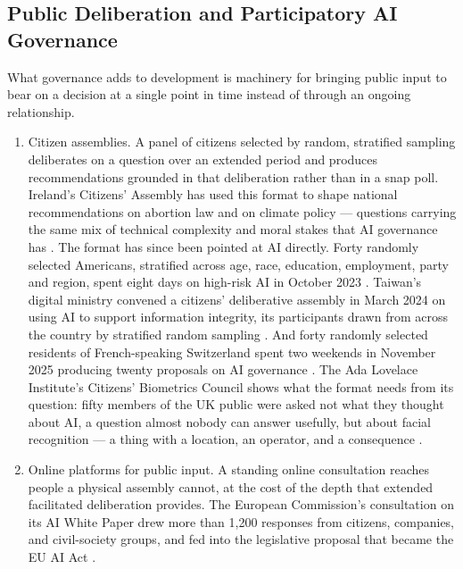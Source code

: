 \subsection{Public Deliberation and Participatory AI Governance}
\label{sec:8.2.1}
What governance adds to development is machinery for bringing public input to bear on a decision at a single point in time instead of through an ongoing relationship.

\begin{enumerate}
  \item Citizen assemblies. A panel of citizens selected by random, stratified sampling deliberates on a question over an extended period and produces recommendations grounded in that deliberation rather than in a snap poll. Ireland's Citizens' Assembly has used this format to shape national recommendations on abortion law and on climate policy — questions carrying the same mix of technical complexity and moral stakes that AI governance has \autocite{citizensassembly2016ireland}. The format has since been pointed at AI directly. Forty randomly selected Americans, stratified across age, race, education, employment, party and region, spent eight days on high-risk AI in October 2023 \autocite{cndp2023assembly}. Taiwan's digital ministry convened a citizens' deliberative assembly in March 2024 on using AI to support information integrity, its participants drawn from across the country by stratified random sampling \autocite{moda2024integrity}. And forty randomly selected residents of French-speaking Switzerland spent two weekends in November 2025 producing twenty proposals on AI governance \autocite{epfl2025assembly}. The Ada Lovelace Institute's Citizens' Biometrics Council shows what the format needs from its question: fifty members of the UK public were asked not what they thought about AI, a question almost nobody can answer usefully, but about facial recognition — a thing with a location, an operator, and a consequence \autocite{adalovelaceinstitute2021biometrics}.
  \item Online platforms for public input. A standing online consultation reaches people a physical assembly cannot, at the cost of the depth that extended facilitated deliberation provides. The European Commission's consultation on its AI White Paper drew more than 1,200 responses from citizens, companies, and civil-society groups, and fed into the legislative proposal that became the EU AI Act \autocite{europeancommission2020whitepaper}.

\end{enumerate}
